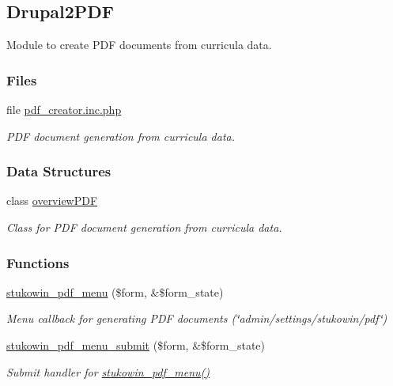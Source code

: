 \hypertarget{group___drupal2_p_d_f}{\subsection{Drupal2\+P\+D\+F}
\label{group___drupal2_p_d_f}
}


Module to create P\+D\+F documents from curricula data.  


\subsubsection*{Files}
\begin{DoxyCompactItemize}
\item 
file \hyperlink{pdf__creator_8inc_8php}{pdf\+\_\+creator.\+inc.\+php}
\begin{DoxyCompactList}\small\item\em P\+D\+F document generation from curricula data. \end{DoxyCompactList}\end{DoxyCompactItemize}
\subsubsection*{Data Structures}
\begin{DoxyCompactItemize}
\item 
class \hyperlink{classoverview_p_d_f}{overview\+P\+D\+F}
\begin{DoxyCompactList}\small\item\em Class for P\+D\+F document generation from curricula data. \end{DoxyCompactList}\end{DoxyCompactItemize}
\subsubsection*{Functions}
\begin{DoxyCompactItemize}
\item 
\hyperlink{group___drupal2_p_d_f_ga3649714a54a489d8c0096116fd9cb367}{stukowin\+\_\+pdf\+\_\+menu} (\$form, \&\$form\+\_\+state)
\begin{DoxyCompactList}\small\item\em Menu callback for generating P\+D\+F documents (\char`\"{}admin/settings/stukowin/pdf\char`\"{}) \end{DoxyCompactList}\item 
\hyperlink{group___drupal2_p_d_f_ga7fd34094c899b5a82949f401e30139a1}{stukowin\+\_\+pdf\+\_\+menu\+\_\+submit} (\$form, \&\$form\+\_\+state)
\begin{DoxyCompactList}\small\item\em Submit handler for \hyperlink{group___drupal2_p_d_f_ga3649714a54a489d8c0096116fd9cb367}{stukowin\+\_\+pdf\+\_\+menu()} \end{DoxyCompactList}\end{DoxyCompactItemize}


